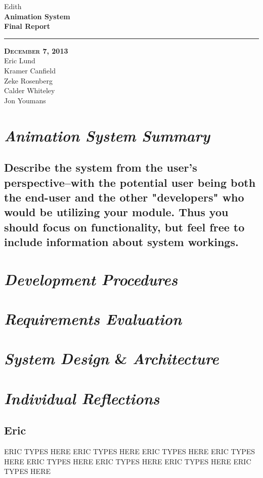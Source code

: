 \documentclass[12pt]{article}
\begin{document}
\begin{titlepage}
	\begin{center}
	\huge  Edith \\
	\vspace*{\fill}%
 	\huge \textbf{Animation System \\Final Report}
	\bigskip 
	\rule{130mm}{.1pt}
	\textsc{\textbf{December 7, 2013} \\ }
	\vspace*{\fill}%
	Eric Lund \\
	Kramer Canfield \\ 
	Zeke Rosenberg \\
	Calder Whiteley \\
	Jon Youmans
	\end{center}
\end{titlepage}

\section{\emph{Animation System Summary}}%

\subsection{Describe the system from the user's perspective--with the potential user being both the end-user and the other "developers" who would be utilizing your module. Thus you should focus on functionality, but feel free to include information about system workings.}

\section{\emph{Development Procedures}}
\section{\emph{Requirements Evaluation}}
\section{\emph{System Design} \& \emph{Architecture}}
\section{\emph{Individual Reflections}}
\subsection{Eric}
\begin{changemargin}{1cm}{0cm} 
ERIC TYPES HERE  ERIC TYPES HERE  ERIC TYPES HERE  ERIC TYPES HERE  ERIC TYPES HERE  ERIC TYPES HERE  ERIC TYPES HERE  ERIC TYPES HERE
\end{changemargin} 
\end{document}
